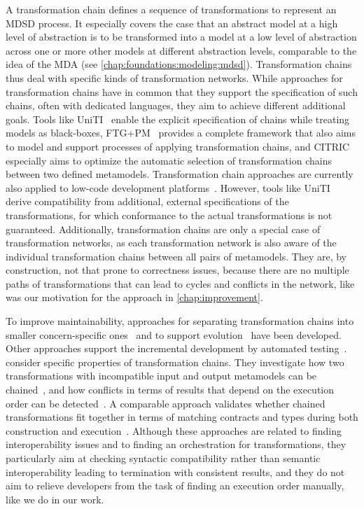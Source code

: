 A transformation chain defines a sequence of transformations to represent an \gls{MDSD} process.
It especially covers the case that an abstract model at a high level of abstraction is to be transformed into a model at a low level of abstraction across one or more other models at different abstraction levels, comparable to the idea of the \gls{MDA} (see \autoref{chap:foundations:modeling:mdsd}).
Transformation chains thus deal with specific kinds of transformation networks.
While approaches for transformation chains have in common that they support the specification of such chains, often with dedicated languages, they aim to achieve different additional goals.
Tools like UniTI~\cite{vanhooff2006a, vanhooff2007UniTI-MODELS, pilgrim2008constructingChains-ECMDA} enable the explicit specification of chains while treating models as black-boxes, FTG+PM~\cite{lucio2013FTGPM-SDL} provides a complete framework that also aims to model and support processes of applying transformation chains, and CITRIC~\cite{basciani2018chains-MODELS} especially aims to optimize the automatic selection of transformation chains between two defined metamodels.
Transformation chain approaches are currently also applied to low-code development platforms~\cite{sahay2020TransformationCompositionLowCode-Models}.
However, tools like UniTI derive compatibility from additional, external specifications of the transformations, for which conformance to the actual transformations is not guaranteed.
Additionally, transformation chains are only a special case of transformation networks, as each transformation network is also aware of the individual transformation chains between all pairs of metamodels.
They are, by construction, not that prone to correctness issues, because there are no multiple paths of transformations that can lead to cycles and conflicts in the network, like was our motivation for the \commonalities approach in \autoref{chap:improvement}.

To improve maintainability, approaches for separating transformation chains into smaller concern-specific ones~\cite{yie2012a} and to support evolution~\cite{yie2009a} have been developed.
Other approaches support the incremental development by automated testing~\cite{kuester2009incremetalChainDevelopment-MODELS}.
 consider specific properties of transformation chains.
They investigate how two transformations with incompatible input and output metamodels can be chained~\cite{etien2010Combining-SAC}, and how conflicts in terms of results that depend on the execution order can be detected~\cite{etien2012Chaining-AMT}.
A comparable approach validates whether chained transformations fit together in terms of matching contracts and types during both construction and execution~\cite{heidenreich2010compositionTransformations-ICMT}.
Although these approaches are related to finding interoperability issues and to finding an orchestration for transformations, they particularly aim at checking syntactic compatibility rather than semantic interoperability leading to termination with consistent results, and they do not aim to relieve developers from the task of finding an execution order manually, like we do in our work.

